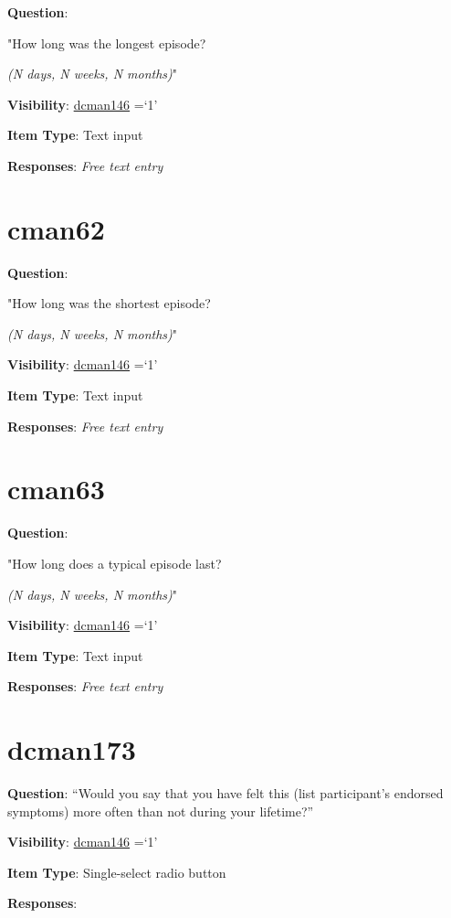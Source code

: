 \documentclass[]{book}
\begin{document}
\textbf{Question}:

"How long was the longest episode?

\emph{(N days, N weeks, N months)}"

\textbf{Visibility}: \protect\hyperlink{dcman146}{dcman146} =`1'

\textbf{Item Type}: Text input

\textbf{Responses}: \emph{Free text entry}

\hypertarget{cman62}{%
\section{cman62}\label{cman62}}

\textbf{Question}:

"How long was the shortest episode?

\emph{(N days, N weeks, N months)}"

\textbf{Visibility}: \protect\hyperlink{dcman146}{dcman146} =`1'

\textbf{Item Type}: Text input

\textbf{Responses}: \emph{Free text entry}

\hypertarget{cman63}{%
\section{cman63}\label{cman63}}

\textbf{Question}:

"How long does a typical episode last?

\emph{(N days, N weeks, N months)}"

\textbf{Visibility}: \protect\hyperlink{dcman146}{dcman146} =`1'

\textbf{Item Type}: Text input

\textbf{Responses}: \emph{Free text entry}

\hypertarget{dcman173}{%
\section{dcman173}\label{dcman173}}

\textbf{Question}: ``Would you say that you have felt this (list participant's endorsed symptoms) more often than not during your lifetime?''

\textbf{Visibility}: \protect\hyperlink{dcman146}{dcman146} =`1'

\textbf{Item Type}: Single-select radio button

\textbf{Responses}:
\end{document}
